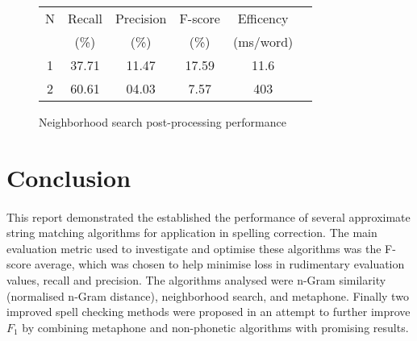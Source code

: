 \documentclass[twocolumn]{article}
\begin{document}
\begin{figure}[t]
    \begin{center}

        \begin{tabular}{|c|c|c|c|c|c|}
            \hline
            N & Recall & Precision & F-score & Efficency\\
             & (\%) & (\%)&(\%) &(ms/word)\\

                            \hline\hline
            1 & 37.71 & 11.47 & 17.59 & 11.6\\
            2 & 60.61 & 04.03 & 7.57 & 403\\
            \hline
        \end{tabular}
    \caption{Neighborhood search post-processing performance}

    \end{center}
\end{figure}



    \section{Conclusion}
\paragraph{}
    This report demonstrated the established the performance of several approximate string matching algorithms for
    application in spelling correction.
    The main evaluation metric used to investigate and optimise these algorithms was the F-score average, which was chosen
    to help minimise loss in rudimentary evaluation values, recall and precision.
    The algorithms analysed were n-Gram similarity (normalised n-Gram distance), neighborhood search, and metaphone.
    Finally two improved spell checking methods were proposed in an attempt to further improve $F_1$ by combining
    metaphone and non-phonetic algorithms with promising results.


    \printbibliography
\end{document}
